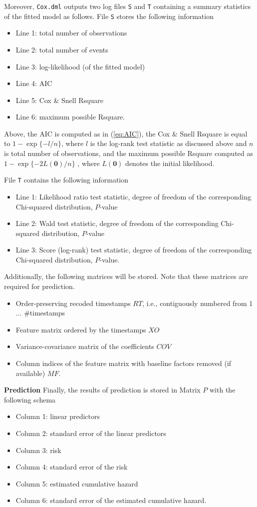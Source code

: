 Moreover, {\tt Cox.dml} outputs two log files {\tt S} and {\tt T} containing a summary statistics of the fitted model as follows.
File {\tt S} stores the following information 
\begin{itemize}
	\item Line 1: total number of observations
	\item Line 2: total number of events
	\item Line 3: log-likelihood (of the fitted model)
	\item Line 4: AIC
	\item Line 5: Cox \& Snell Rsquare
	\item Line 6: maximum possible Rsquare. 
\end{itemize}
Above, the AIC is computed as in (\ref{eq:AIC}),
the Cox \& Snell Rsquare is equal to $1-\exp\{ -l/n \}$, where $l$ is the log-rank test statistic as discussed above and $n$ is total number of observations,
and the maximum possible Rsquare computed as $1-\exp\{ -2 L(\textbf{0})/n \}$ , where $L(\textbf{0})$ denotes the initial likelihood. 


File {\tt T} contains the following information
\begin{itemize}
	\item Line 1: Likelihood ratio test statistic, degree of freedom of the corresponding Chi-squared distribution, $P$-value
	\item Line 2: Wald test statistic, degree of freedom of the corresponding Chi-squared distribution, $P$-value
	\item Line 3: Score (log-rank) test statistic, degree of freedom of the corresponding Chi-squared distribution, $P$-value.
\end{itemize}

Additionally, the following matrices will be stored. Note that these matrices are required for prediction.
\begin{itemize}
	 \item Order-preserving recoded timestamps $RT$, i.e., contiguously numbered from 1 $\ldots$ \#timestamps
	 \item Feature matrix ordered by the timestamps $XO$
	 \item Variance-covariance matrix of the coefficients $COV$
	 \item Column indices of the feature matrix with baseline factors removed (if available) $MF$.  
\end{itemize}


\textbf{Prediction}
Finally, the results of prediction is stored in Matrix $P$ with the following schema
\begin{itemize}
	\item Column 1: linear predictors
	\item Column 2: standard error of the linear predictors
	\item Column 3: risk
	\item Column 4: standard error of the risk
	\item Column 5: estimated cumulative hazard
	\item Column 6: standard error of the estimated cumulative hazard.
\end{itemize}




